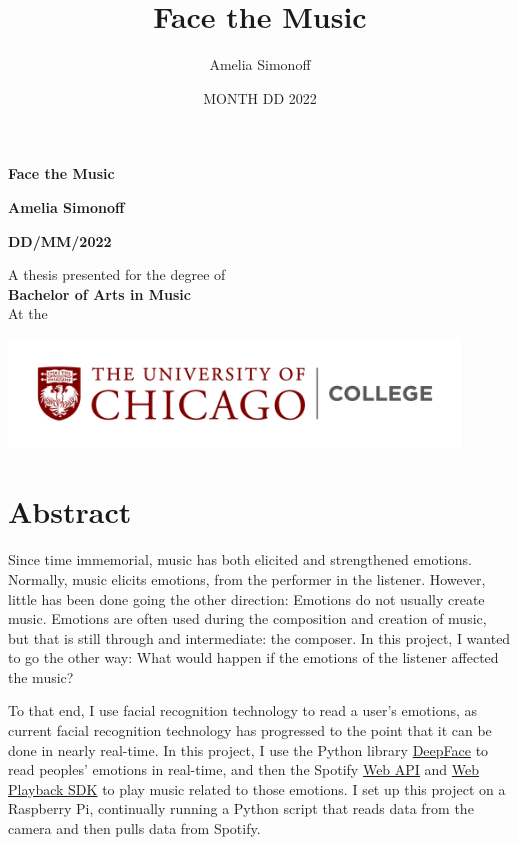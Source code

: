 \documentclass{article}
\title{Face the Music}
\author{Amelia Simonoff}
\date{MONTH DD 2022}
\renewcommand{\_}[1]{\underline{ #1 }}
\theoremstyle{definition}
\begin{document}
\begin{titlepage}
    \begin{center}
        \vspace*{1cm}
            
        \Huge
        \textbf{Face the Music}
            
        \vspace{0.5cm}
        \LARGE
            
        \vspace{1.5cm}
            
        \textbf{Amelia Simonoff}
        
        \textbf{DD/MM/2022}
            
        \vfill
            
        A thesis presented for the degree of\\
        \textbf{Bachelor of Arts in Music} \\
        At the
        
        \vspace{0.8cm}
            
        \includegraphics[width=0.9\textwidth]{UChicago_College_Horizontal_Color_RGB.png}

        \Large
            
    \end{center}
\end{titlepage}

\section{Abstract}

Since time immemorial, music has both elicited and strengthened emotions. Normally, music elicits emotions, from the performer in the listener. However, little has been done going the other direction: Emotions do not usually create music. Emotions are often used during the composition and creation of music, but that is still through and intermediate: the composer. In this project, I wanted to go the other way: What would happen if the emotions of the listener affected the music?

To that end, I use facial recognition technology to read a user's emotions, as current facial recognition technology has progressed to the point that it can be done in nearly real-time. In this project, I use the Python library \href{https://pypi.org/project/deepface/}{DeepFace} to read peoples' emotions in real-time, and then the Spotify \href{https://developer.spotify.com/documentation/web-api/reference/}{Web API} and \href{https://developer.spotify.com/documentation/web-playback-sdk/reference/}{Web Playback SDK} to play music related to those emotions. I set up this project on a Raspberry Pi, continually running a Python script that reads data from the camera and then pulls data from Spotify. 
\end{document}
